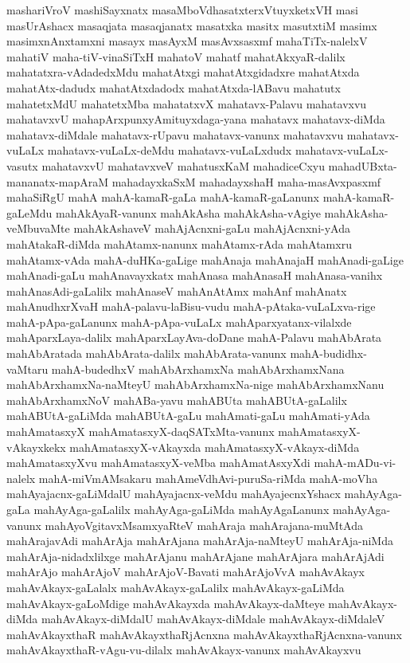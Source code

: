 {mashariVroV
mashiSayxnatx
masaMboVdhasatxterxVtuyxketxVH
masi
masUrAshacx
masaqjata
masaqjanatx
masatxka
masitx
masutxtiM
masimx
masimxnAnxtamxni
masayx
masAyxM
masAvxsasxmf
mahaTiTx-nalelxV
mahatiV
maha-tiV-vinaSiTxH
mahatoV
mahatf
mahatAkxyaR-dalilx
mahatatxra-vAdadedxMdu
mahatAtxgi
mahatAtxgidadxre
mahatAtxda
mahatAtx-dadudx
mahatAtxdadodx
mahatAtxda-lABavu
mahatutx
mahatetxMdU
mahatetxMba
mahatatxvX
mahatavx-Palavu
mahatavxvu
mahatavxvU
mahapArxpunxyAmituyxdaga-yana
mahatavx
mahatavx-diMda
mahatavx-diMdale
mahatavx-rUpavu
mahatavx-vanunx
mahatavxvu
mahatavx-vuLaLx
mahatavx-vuLaLx-deMdu
mahatavx-vuLaLxdudx
mahatavx-vuLaLx-vasutx
mahatavxvU
mahatavxveV
mahatusxKaM
mahadiceCxyu
mahadUBxta-mananatx-mapAraM
mahadayxkaSxM
mahadayxshaH
maha-masAvxpasxmf
mahaSiRgU
mahA
mahA-kamaR-gaLa
mahA-kamaR-gaLanunx
mahA-kamaR-gaLeMdu
mahAkAyaR-vanunx
mahAkAsha
mahAkAsha-vAgiye
mahAkAsha-veMbuvaMte
mahAkAshaveV
mahAjAcnxni-gaLu
mahAjAcnxni-yAda
mahAtakaR-diMda
mahAtamx-nanunx
mahAtamx-rAda
mahAtamxru
mahAtamx-vAda
mahA-duHKa-gaLige
mahAnaja
mahAnajaH
mahAnadi-gaLige
mahAnadi-gaLu
mahAnavayxkatx
mahAnasa
mahAnasaH
mahAnasa-vanihx
mahAnasAdi-gaLalilx
mahAnaseV
mahAnAtAmx
mahAnf
mahAnatx
mahAnudhxrXvaH
mahA-palavu-laBisu-vudu
mahA-pAtaka-vuLaLxva-rige
mahA-pApa-gaLanunx
mahA-pApa-vuLaLx
mahAparxyatanx-vilalxde
mahAparxLaya-dalilx
mahAparxLayAva-doDane
mahA-Palavu
mahAbArata
mahAbAratada
mahAbArata-dalilx
mahAbArata-vanunx
mahA-budidhx-vaMtaru
mahA-budedhxV
mahAbArxhamxNa
mahAbArxhamxNana
mahAbArxhamxNa-naMteyU
mahAbArxhamxNa-nige
mahAbArxhamxNanu
mahAbArxhamxNoV
mahABa-yavu
mahABUta
mahABUtA-gaLalilx
mahABUtA-gaLiMda
mahABUtA-gaLu
mahAmati-gaLu
mahAmati-yAda
mahAmatasxyX
mahAmatasxyX-daqSATxMta-vanunx
mahAmatasxyX-vAkayxkekx
mahAmatasxyX-vAkayxda
mahAmatasxyX-vAkayx-diMda
mahAmatasxyXvu
mahAmatasxyX-veMba
mahAmatAsxyXdi
mahA-mADu-vi-nalelx
mahA-miVmAMsakaru
mahAmeVdhAvi-puruSa-riMda
mahA-moVha
mahAyajacnx-gaLiMdalU
mahAyajacnx-veMdu
mahAyajecnxYshacx
mahAyAga-gaLa
mahAyAga-gaLalilx
mahAyAga-gaLiMda
mahAyAgaLanunx
mahAyAga-vanunx
mahAyoVgitavxMsamxyaRteV
mahAraja
mahArajana-muMtAda
mahArajavAdi
mahArAja
mahArAjana
mahArAja-naMteyU
mahArAja-niMda
mahArAja-nidadxlilxge
mahArAjanu
mahArAjane
mahArAjara
mahArAjAdi
mahArAjo
mahArAjoV
mahArAjoV-Bavati
mahArAjoVvA
mahAvAkayx
mahAvAkayx-gaLalalx
mahAvAkayx-gaLalilx
mahAvAkayx-gaLiMda
mahAvAkayx-gaLoMdige
mahAvAkayxda
mahAvAkayx-daMteye
mahAvAkayx-diMda
mahAvAkayx-diMdalU
mahAvAkayx-diMdale
mahAvAkayx-diMdaleV
mahAvAkayxthaR
mahAvAkayxthaRjAcnxna
mahAvAkayxthaRjAcnxna-vanunx
mahAvAkayxthaR-vAgu-vu-dilalx
mahAvAkayx-vanunx
mahAvAkayxvu
}

